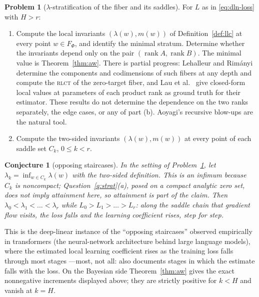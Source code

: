 \documentclass[11pt]{amsart}
\theoremstyle{plain}
\newtheorem{conjecture}[theorem]{Conjecture}
\theoremstyle{definition}
\newtheorem{problem}[theorem]{Problem}
\newcommand{\rank}{\operatorname{rank}}
\begin{document}
\begin{problem}[$\lambda$-stratification of the fiber and its saddles]\label{prob:fiber}
For $L$ as in \eqref{eq:dln-loss} with $H > r$:
\begin{enumerate}
\item[(a)] Compute the local invariants $(\lambda(w), m(w))$ of Definition~\ref{def:llc} at every point $w \in F_\Phi$, and identify the minimal stratum. Determine whether the invariants depend only on the pair $(\rank A, \rank B)$. The minimal value is Theorem~\ref{thm:aw}. There is partial progress: Lehalleur and Rim\'anyi \cite{lehalleurrimanyi2024} determine the components and codimensions of such fibers at any depth and compute the \textsc{rlct} of the zero-target fiber, and Lau et al.~\cite{lau2023} give closed-form local values at parameters of each product rank as ground truth for their estimator. These results do not determine the dependence on the two ranks separately, the edge cases, or any of part (b). Aoyagi's recursive blow-ups \cite{aoyagi2005,aoyagi2024} are the natural tool.
\item[(b)] Compute the two-sided invariants $(\lambda(w), m(w))$ at every point of each saddle set $C_k$, $0 \le k < r$.
\end{enumerate}
\end{problem}

\begin{conjecture}[opposing staircases]\label{conj:opposing}
In the setting of Problem~\ref{prob:fiber}, let $\lambda_k = \inf_{w \in C_k} \lambda(w)$ with the two-sided definition. This is an infimum because $C_k$ is noncompact; Question~\ref{q:strat}(a), posed on a compact analytic zero set, does not imply attainment here, so attainment is part of the claim. Then $\lambda_0 < \lambda_1 < \dots < \lambda_r$ while $L_0 > L_1 > \dots > L_r$: along the saddle chain that gradient flow visits, the loss falls and the learning coefficient rises, step for step.
\end{conjecture}

This is the deep-linear instance of the ``opposing staircases'' observed empirically in transformers (the neural-network architecture behind large language models), where the estimated local learning coefficient rises as the training loss falls through most stages \cite{hoogland2024, chen2023}---most, not all: \cite{hoogland2024} also documents stages in which the estimate falls with the loss. On the Bayesian side Theorem~\ref{thm:aw} gives the exact nonnegative increments displayed above; they are strictly positive for $k<H$ and vanish at $k=H$.
\end{document}

